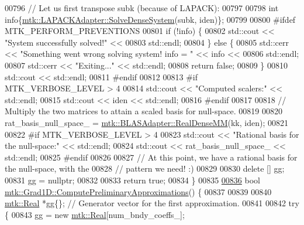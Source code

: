 \begin{DoxyCode}
{{00796   \textcolor{comment}{// Let us first transpose subk (because of LAPACK):}
00797 
00798   \textcolor{keywordtype}{int} info\{\hyperlink{classmtk_1_1LAPACKAdapter_a7428bccf74fd4a4af68fb7233846da22}{mtk::LAPACKAdapter::SolveDenseSystem}(subk, iden)\};
00799 
00800 \textcolor{preprocessor}{  #ifdef MTK\_PERFORM\_PREVENTIONS}
00801   \textcolor{keywordflow}{if} (!info) \{
00802     std::cout << \textcolor{stringliteral}{"System successfully solved!"} <<
00803       std::endl;
00804   \} \textcolor{keywordflow}{else} \{
00805     std::cerr << \textcolor{stringliteral}{"Something went wrong solving system! info = "} << info <<
00806       std::endl;
00807     std::cerr << \textcolor{stringliteral}{"Exiting..."} << std::endl;
00808     \textcolor{keywordflow}{return} \textcolor{keyword}{false};
00809   \}
00810   std::cout << std::endl;
00811 \textcolor{preprocessor}{  #endif}
00812 
00813 \textcolor{preprocessor}{  #if MTK\_VERBOSE\_LEVEL > 4}
00814   std::cout << \textcolor{stringliteral}{"Computed scalers:"} << std::endl;
00815   std::cout << iden << std::endl;
00816 \textcolor{preprocessor}{  #endif}
00817 
00818   \textcolor{comment}{// Multiply the two matrices to attain a scaled basis for null-space.}
00819 
00820   rat\_basis\_null\_space\_ = \hyperlink{classmtk_1_1BLASAdapter_acebd0e9bfe0bdd609c7fbea98ccfd3b5}{mtk::BLASAdapter::RealDenseMM}(kk, iden);
00821 
00822 \textcolor{preprocessor}{  #if MTK\_VERBOSE\_LEVEL > 4}
00823   std::cout << \textcolor{stringliteral}{"Rational basis for the null-space:"} << std::endl;
00824   std::cout << rat\_basis\_null\_space\_ << std::endl;
00825 \textcolor{preprocessor}{  #endif}
00826 
00827   \textcolor{comment}{// At this point, we have a rational basis for the null-space, with the}
00828   \textcolor{comment}{// pattern we need! :)}
00829 
00830   \textcolor{keyword}{delete} [] gg;
00831   gg = \textcolor{keyword}{nullptr};
00832 
00833   \textcolor{keywordflow}{return} \textcolor{keyword}{true};
00834 \}
00835 
\hypertarget{mtk__grad__1d_8cc_source_l00836}{}\hyperlink{classmtk_1_1Grad1D_add4c68a6e78d8b9c2b800b3f96f4757d}{00836} \textcolor{keywordtype}{bool} \hyperlink{classmtk_1_1Grad1D_add4c68a6e78d8b9c2b800b3f96f4757d}{mtk::Grad1D::ComputePreliminaryApproximations}() \{
00837 
00839 
00840   \hyperlink{group__c01-roots_gac080bbbf5cbb5502c9f00405f894857d}{mtk::Real} *gg\{\}; \textcolor{comment}{// Generator vector for the first approximation.}
00841 
00842   \textcolor{keywordflow}{try} \{
00843     gg = \textcolor{keyword}{new} \hyperlink{group__c01-roots_gac080bbbf5cbb5502c9f00405f894857d}{mtk::Real}[num\_bndy\_coeffs\_];
}}
\end{DoxyCode}
